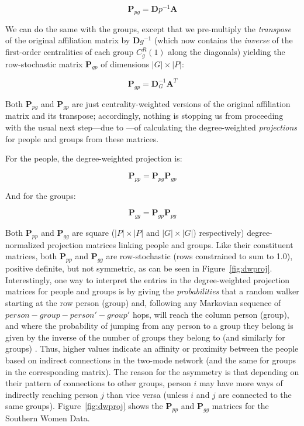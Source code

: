 \documentclass[a4paper,fleqn]{cas-sc}
\begin{document}
\begin{equation}
    \mathbf{P}_{pg} = \mathbf{D}p^{-1}\mathbf{A}
    \label{eq:ca1}
\end{equation}

We can do the same with the groups, except that we pre-multiply the \textit{transpose} of the original affiliation matrix by $\mathbf{D}g^{-1}$ (which now contains the \textit{inverse} of the first-order centralities of each group $C^R_g(1)$ along the diagonals) yielding the row-stochastic matrix $\mathbf{P}_{gp}$ of dimensions $|G| \times |P|$:

\begin{equation}
    \mathbf{P}_{gp} = \mathbf{D}_G^{-1}\mathbf{A}^T
    \label{eq:ca2}
\end{equation}

Both $\mathbf{P}_{pg}$ and $\mathbf{P}_{gp}$ are just centrality-weighted versions of the original affiliation matrix and its transpose; accordingly, nothing is stopping us from proceeding with the usual next step---due to \citet{breiger1974duality}---of calculating the degree-weighted \textit{projections} for people and groups from these matrices. 

For the people, the degree-weighted projection is:

\begin{equation}
\mathbf{P}_{pp} = \mathbf{P}_{pg}\mathbf{P}_{gp}
    \label{eq:ca3}
\end{equation}

And for the groups:

\begin{equation}
    \mathbf{P}_{gg} = \mathbf{P}_{gp}\mathbf{P}_{pg}
    \label{eq:ca4}
\end{equation}

Both $\mathbf{P}_{pp}$ and $\mathbf{P}_{gg}$ are square ($|P| \times |P|$ and $|G| \times |G|$) respectively) degree-normalized projection matrices linking people and groups. Like their constituent matrices, both $\mathbf{P}_{pp}$ and $\mathbf{P}_{gg}$ are row-stochastic (rows constrained to sum to 1.0), positive definite, but not symmetric, as can be seen in Figure~\ref{fig:dwproj}. Interestingly, one way to interpret the entries in the degree-weighted projection matrices for people and groups is by giving the \textit{probabilities} that a random walker starting at the row person (group) and, following any Markovian sequence of $person-group-person'-group'$ hops, will reach the column person (group), and where the probability of jumping from any person to a group they belong is given by the inverse of the number of groups they belong to (and similarly for groups) \citep[240]{deng2009generalized}. Thus, higher values indicate an affinity or proximity between the people based on indirect connections in the two-mode network (and the same for groups in the corresponding matrix). The reason for the asymmetry is that depending on their pattern of connections to other groups, person $i$ may have more ways of indirectly reaching person $j$ than vice versa (unless $i$ and $j$ are connected to the same groups). Figure~\ref{fig:dwproj} shows the $\mathbf{P}_{pp}$ and $\mathbf{P}_{gg}$ matrices for the Southern Women Data. 
\end{document}
